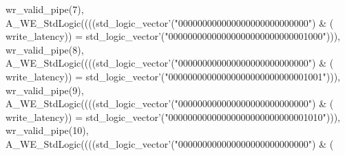 \begin{DoxyCode}
{      wr_valid_pipe}\textcolor{vhdlchar}{(}\textcolor{vhdllogic}{}\textcolor{vhdllogic}{7}\textcolor{vhdlchar}{)}\textcolor{vhdlchar}{,} \textcolor{vhdlchar}{A\_WE\_StdLogic}\textcolor{vhdlchar}{(}\textcolor{vhdlchar}{(}\textcolor{vhdlchar}{(}\textcolor{vhdlchar}{(}\textcolor{comment}{std\_logic\_vector}\textcolor{vhdlchar}{'}\textcolor{vhdlchar}{(}\textcolor{vhdllogic}{"000000000000000000000000000"}\textcolor{vhdlchar}{)} \textcolor{vhdlchar}{&} \textcolor{vhdlchar}{(}\textcolor{vhdlchar}{
      write_latency}\textcolor{vhdlchar}{)}\textcolor{vhdlchar}{)} \textcolor{vhdlchar}{=} \textcolor{comment}{std\_logic\_vector}\textcolor{vhdlchar}{'}\textcolor{vhdlchar}{(}\textcolor{vhdllogic}{"00000000000000000000000000001000"}\textcolor{vhdlchar}{)}\textcolor{vhdlchar}{)}\textcolor{vhdlchar}{)}\textcolor{vhdlchar}{,} \textcolor{vhdlchar}{
      wr_valid_pipe}\textcolor{vhdlchar}{(}\textcolor{vhdllogic}{}\textcolor{vhdllogic}{8}\textcolor{vhdlchar}{)}\textcolor{vhdlchar}{,} \textcolor{vhdlchar}{A\_WE\_StdLogic}\textcolor{vhdlchar}{(}\textcolor{vhdlchar}{(}\textcolor{vhdlchar}{(}\textcolor{vhdlchar}{(}\textcolor{comment}{std\_logic\_vector}\textcolor{vhdlchar}{'}\textcolor{vhdlchar}{(}\textcolor{vhdllogic}{"000000000000000000000000000"}\textcolor{vhdlchar}{)} \textcolor{vhdlchar}{&} \textcolor{vhdlchar}{(}\textcolor{vhdlchar}{
      write_latency}\textcolor{vhdlchar}{)}\textcolor{vhdlchar}{)} \textcolor{vhdlchar}{=} \textcolor{comment}{std\_logic\_vector}\textcolor{vhdlchar}{'}\textcolor{vhdlchar}{(}\textcolor{vhdllogic}{"00000000000000000000000000001001"}\textcolor{vhdlchar}{)}\textcolor{vhdlchar}{)}\textcolor{vhdlchar}{)}\textcolor{vhdlchar}{,} \textcolor{vhdlchar}{
      wr_valid_pipe}\textcolor{vhdlchar}{(}\textcolor{vhdllogic}{}\textcolor{vhdllogic}{9}\textcolor{vhdlchar}{)}\textcolor{vhdlchar}{,} \textcolor{vhdlchar}{A\_WE\_StdLogic}\textcolor{vhdlchar}{(}\textcolor{vhdlchar}{(}\textcolor{vhdlchar}{(}\textcolor{vhdlchar}{(}\textcolor{comment}{std\_logic\_vector}\textcolor{vhdlchar}{'}\textcolor{vhdlchar}{(}\textcolor{vhdllogic}{"000000000000000000000000000"}\textcolor{vhdlchar}{)} \textcolor{vhdlchar}{&} \textcolor{vhdlchar}{(}\textcolor{vhdlchar}{
      write_latency}\textcolor{vhdlchar}{)}\textcolor{vhdlchar}{)} \textcolor{vhdlchar}{=} \textcolor{comment}{std\_logic\_vector}\textcolor{vhdlchar}{'}\textcolor{vhdlchar}{(}\textcolor{vhdllogic}{"00000000000000000000000000001010"}\textcolor{vhdlchar}{)}\textcolor{vhdlchar}{)}\textcolor{vhdlchar}{)}\textcolor{vhdlchar}{,} \textcolor{vhdlchar}{
      wr_valid_pipe}\textcolor{vhdlchar}{(}\textcolor{vhdllogic}{}\textcolor{vhdllogic}{10}\textcolor{vhdlchar}{)}\textcolor{vhdlchar}{,} \textcolor{vhdlchar}{A\_WE\_StdLogic}\textcolor{vhdlchar}{(}\textcolor{vhdlchar}{(}\textcolor{vhdlchar}{(}\textcolor{vhdlchar}{(}\textcolor{comment}{std\_logic\_vector}\textcolor{vhdlchar}{'}\textcolor{vhdlchar}{(}\textcolor{vhdllogic}{"000000000000000000000000000"}\textcolor{vhdlchar}{)} \textcolor{vhdlchar}{&} \textcolor{vhdlchar}{(}\textcolor{vhdlchar}{
}
\end{DoxyCode}
